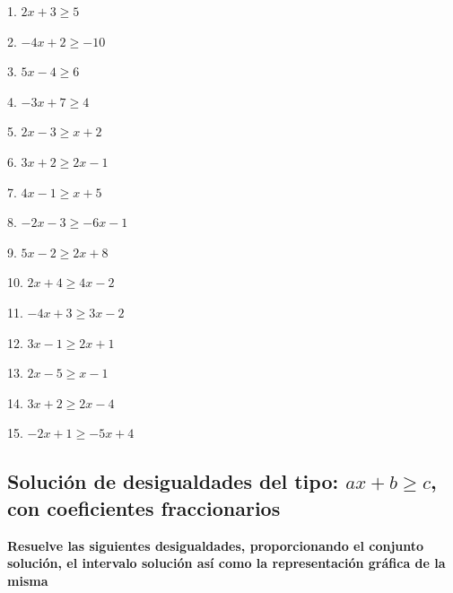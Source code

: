 \documentclass[]{book}
\begin{document}
\begin{multicols}{3}
1. $2x + 3 \geq 5$

2. $-4x + 2 \geq -10$

3. $5x - 4 \geq 6$

4. $-3x + 7 \geq 4$

5. $2x - 3 \geq x + 2$

6. $3x + 2 \geq 2x - 1$

7. $4x - 1 \geq x + 5$

8. $-2x - 3 \geq -6x - 1$

9. $5x - 2 \geq 2x + 8$

10. $2x + 4 \geq 4x - 2$

11. $-4x + 3 \geq 3x - 2$

12. $3x - 1 \geq 2x + 1$

13. $2x - 5 \geq x - 1$

14. $3x + 2 \geq 2x - 4$

15. $-2x + 1 \geq -5x + 4$
\end{multicols}

\subsection{\texorpdfstring{Solución de desigualdades del tipo:
\(ax+b \geq c\), con coeficientes
fraccionarios}{Solución de desigualdades del tipo: ax+b \textbackslash{}geq c, con coeficientes fraccionarios}}\label{soluciuxf3n-de-desigualdades-del-tipo-axb-geq-c-con-coeficientes-fraccionarios}

\textbf{Resuelve las siguientes desigualdades, proporcionando el
conjunto solución, el intervalo solución así como la representación
gráfica de la misma}
\end{document}
